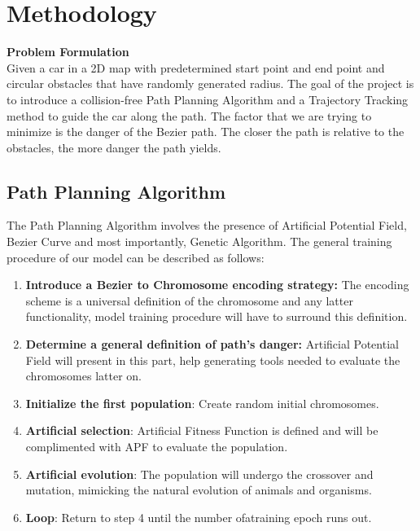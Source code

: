\section{Methodology}
  \textbf{Problem Formulation}\\
  Given a car in a 2D map with predetermined start point and end point and circular obstacles that have randomly generated radius. The goal of the project is to introduce a collision-free Path Planning Algorithm and a Trajectory Tracking method to guide the car along the path.
  The factor that we are trying to minimize is the danger of the Bezier path. The closer the path is relative to the obstacles, the more danger the path yields.

  \subsection{Path Planning Algorithm}
  The Path Planning Algorithm involves the presence of Artificial Potential Field, Bezier Curve and most importantly, Genetic Algorithm. The general training procedure of our model can be described as follows:
  \begin{enumerate}
    \item \textbf{Introduce a Bezier to Chromosome encoding strategy:} The encoding scheme is a universal definition of the chromosome and any latter functionality, model training procedure will have to surround this definition.
    \item \textbf{Determine a general definition of path's danger:} Artificial Potential Field will present in this part, help generating tools needed to evaluate the chromosomes latter on.
    \item \textbf{Initialize the first population}: Create random initial chromosomes.
    \item \textbf{Artificial selection}: Artificial Fitness Function is defined and will be complimented with APF to evaluate the population.
    \item \textbf{Artificial evolution}: The population will undergo the crossover and mutation, mimicking the natural evolution of animals and organisms.
    \item \textbf{Loop}: Return to step 4 until the number ofatraining epoch runs out.
  \end{enumerate}

